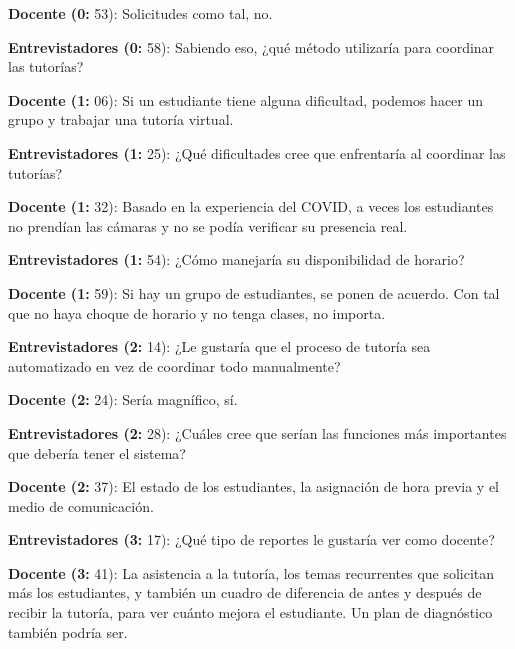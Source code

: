 \noindent\textbf{Docente (0:} 53): Solicitudes como tal, no.\par\smallskip

\noindent\textbf{Entrevistadores (0:} 58): Sabiendo eso, ¿qué método utilizaría para coordinar las tutorías?\par\smallskip

\noindent\textbf{Docente (1:} 06): Si un estudiante tiene alguna dificultad, podemos hacer un grupo y trabajar una tutoría virtual.\par\smallskip

\noindent\textbf{Entrevistadores (1:} 25): ¿Qué dificultades cree que enfrentaría al coordinar las tutorías?\par\smallskip

\noindent\textbf{Docente (1:} 32): Basado en la experiencia del COVID, a veces los estudiantes no prendían las cámaras y no se podía verificar su presencia real.\par\smallskip

\noindent\textbf{Entrevistadores (1:} 54): ¿Cómo manejaría su disponibilidad de horario?\par\smallskip

\noindent\textbf{Docente (1:} 59): Si hay un grupo de estudiantes, se ponen de acuerdo. Con tal que no haya choque de horario y no tenga clases, no importa.\par\smallskip

\noindent\textbf{Entrevistadores (2:} 14): ¿Le gustaría que el proceso de tutoría sea automatizado en vez de coordinar todo manualmente?\par\smallskip

\noindent\textbf{Docente (2:} 24): Sería magnífico, sí.\par\smallskip

\noindent\textbf{Entrevistadores (2:} 28): ¿Cuáles cree que serían las funciones más importantes que debería tener el sistema?\par\smallskip

\noindent\textbf{Docente (2:} 37): El estado de los estudiantes, la asignación de hora previa y el medio de comunicación.\par\smallskip

\noindent\textbf{Entrevistadores (3:} 17): ¿Qué tipo de reportes le gustaría ver como docente?\par\smallskip

\noindent\textbf{Docente (3:} 41): La asistencia a la tutoría, los temas recurrentes que solicitan más los estudiantes, y también un cuadro de diferencia de antes y después de recibir la tutoría, para ver cuánto mejora el estudiante. Un plan de diagnóstico también podría ser.\par\smallskip

